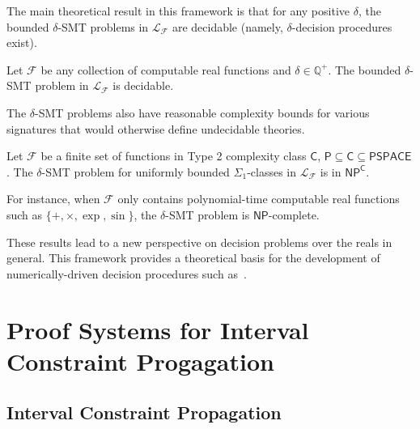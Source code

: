 \documentclass[envcountsect]{llncs}
\begin{document}
The main theoretical result in this framework is that for any positive
$\delta$, the bounded $\delta$-SMT problems in $\mathcal{L}_{\mathcal{F}}$ are
decidable (namely, $\delta$-decision
procedures exist). 
\begin{theorem}[Decidability] Let $\mathcal{F}$ be any collection
of computable real functions and $\delta\in \mathbb{Q}^+$. The bounded
$\delta$-SMT
problem in $\mathcal{L}_{\mathcal{F}}$ is decidable.  
\end{theorem}

The $\delta$-SMT problems also have reasonable complexity bounds for various
signatures that would otherwise define undecidable theories.
\begin{theorem}[Complexity]
Let $\mathcal{F}$ be a finite set of functions in Type 2 complexity class
$\mathsf{C}$, $\mathsf{P}\subseteq\mathsf{C}\subseteq\mathsf{PSPACE}$. The
$\delta$-SMT problem for uniformly bounded $\Sigma_1$-classes in
$\mathcal{L}_{\mathcal{F}}$ is in $\mathsf{NP^C}$. 

For instance, when $\mathcal{F}$ only contains polynomial-time
computable real functions such as $\{+, \times, \exp, \sin\}$,
the $\delta$-SMT problem is $\mathsf{NP}$-complete. 
\end{theorem}

These results lead to a
new perspective on decision problems over the reals in general.
This framework provides a theoretical basis for the development of
numerically-driven decision procedures such as~\cite{}.

\section{Proof Systems for Interval Constraint Progagation}\label{icp}

\subsection{Interval Constraint Propagation}
\end{document}
